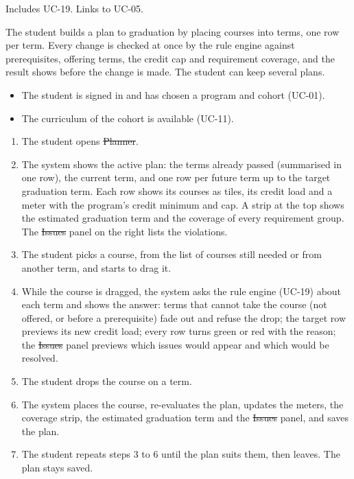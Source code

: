 Includes UC-19. Links to UC-05.


The student builds a plan to graduation by placing courses into terms, one row per term. Every change is checked at once
by the rule engine against prerequisites, offering terms, the credit cap and requirement coverage, and the result shows
before the change is made. The student can keep several plans.

\begin{itemize}
  \item The student is signed in and has chosen a program and cohort (UC-01).
  \item The curriculum of the cohort is available (UC-11).
\end{itemize}

\begin{enumerate}
  \item The student opens \st{Planner}.
  \item The system shows the active plan: the terms already passed (summarised in one row), the current term, and one row
        per future term up to the target graduation term. Each row shows its courses as tiles, its credit load and a
        meter with the program's credit minimum and cap. A strip at the top shows the estimated graduation term and the
        coverage of every requirement group. The \st{Issues} panel on the right lists the violations.
  \item The student picks a course, from the list of courses still needed or from another term, and starts to drag it.
  \item While the course is dragged, the system asks the rule engine (UC-19) about each term and shows the answer:
        terms that cannot take the course (not offered, or before a prerequisite) fade out and refuse the drop; the
        target row previews its new credit load; every row turns green or red with the reason; the \st{Issues} panel
        previews which issues would appear and which would be resolved.
  \item The student drops the course on a term.
  \item The system places the course, re-evaluates the plan, updates the meters, the coverage strip, the estimated
        graduation term and the \st{Issues} panel, and saves the plan.
  \item The student repeats steps 3 to 6 until the plan suits them, then leaves. The plan stays saved.
\end{enumerate}

